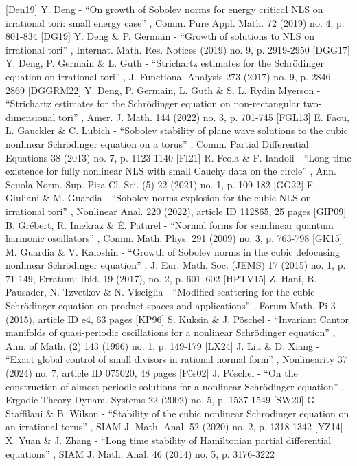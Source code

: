  [Den19] Y. Deng - “On growth of Sobolev norms for energy critical NLS on irrational tori: small energy case” , Comm. Pure Appl. Math. 72 (2019) no. 4, p. 801-834
 [DG19] Y. Deng \& P. Germain - “Growth of solutions to NLS on irrational tori” , Internat. Math. Res. Notices (2019) no. 9, p. 2919-2950
 [DGG17] Y. Deng, P. Germain \& L. Guth - “Strichartz estimates for the Schrödinger equation on irrational tori” , J. Functional Analysis 273 (2017) no. 9, p. 2846-2869
 [DGGRM22] Y. Deng, P. Germain, L. Guth \& S. L. Rydin Myerson - “Strichartz estimates for the Schrödinger equation on non-rectangular two-dimensional tori” , Amer. J. Math. 144 (2022) no. 3, p. 701-745
 [FGL13] E. Faou, L. Gauckler \& C. Lubich - “Sobolev stability of plane wave solutions to the cubic nonlinear Schrödinger equation on a torus” , Comm. Partial Differential Equations 38 (2013) no. 7, p. 1123-1140
 [FI21] R. Feola \& F. Iandoli - “Long time existence for fully nonlinear NLS with small Cauchy data on the circle” , Ann. Scuola Norm. Sup. Pisa Cl. Sci. (5) 22 (2021) no. 1, p. 109-182
 [GG22] F. Giuliani \& M. Guardia - “Sobolev norms explosion for the cubic NLS on irrational tori” , Nonlinear Anal. 220 (2022), article ID 112865, 25 pages
 [GIP09] B. Grébert, R. Imekraz \& É. Paturel - “Normal forms for semilinear quantum harmonic oscillators” , Comm. Math. Phys. 291 (2009) no. 3, p. 763-798
 [GK15] M. Guardia \& V. Kaloshin - “Growth of Sobolev norms in the cubic defocusing nonlinear Schrödinger equation” , J. Eur. Math. Soc. (JEMS) 17 (2015) no. 1, p. 71-149, Erratum: Ibid. 19 (2017), no. 2, p. 601–602
 [HPTV15] Z. Hani, B. Pausader, N. Tzvetkov \& N. Visciglia - “Modified scattering for the cubic Schrödinger equation on product spaces and applications” , Forum Math. Pi 3 (2015), article ID e4, 63 pages
 [KP96] S. Kuksin \& J. Pöschel - “Invariant Cantor manifolds of quasi-periodic oscillations for a nonlinear Schrödinger equation” , Ann. of Math. (2) 143 (1996) no. 1, p. 149-179
 [LX24] J. Liu \& D. Xiang - “Exact global control of small divisors in rational normal form” , Nonlinearity 37 (2024) no. 7, article ID 075020, 48 pages
 [Pös02] J. Pöschel - “On the construction of almost periodic solutions for a nonlinear Schrödinger equation” , Ergodic Theory Dynam. Systems 22 (2002) no. 5, p. 1537-1549
 [SW20] G. Staffilani \& B. Wilson - “Stability of the cubic nonlinear Schrodinger equation on an irrational torus” , SIAM J. Math. Anal. 52 (2020) no. 2, p. 1318-1342
 [YZ14] X. Yuan \& J. Zhang - “Long time stability of Hamiltonian partial differential equations” , SIAM J. Math. Anal. 46 (2014) no. 5, p. 3176-3222

